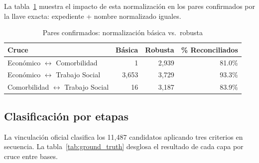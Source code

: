 La tabla~\ref{tab:normalizacion} muestra el impacto de esta normalización en los pares confirmados por la llave exacta: expediente + nombre normalizado iguales.

\begin{table}[H]
\centering
\small
\caption{Pares confirmados: normalización básica vs.\ robusta}
\label{tab:normalizacion}
\begin{tabular}{lrrr}
\toprule
\textbf{Cruce} & \textbf{Básica} & \textbf{Robusta} & \textbf{\% Reconciliados} \\
\midrule
Económico $\leftrightarrow$ Comorbilidad   &     1 & 2,939 & 81.0\% \\
Económico $\leftrightarrow$ Trabajo Social & 3,653 & 3,729 & 93.3\% \\
Comorbilidad $\leftrightarrow$ Trabajo Social & 16 & 3,187 & 83.9\% \\
\bottomrule
\end{tabular}
\end{table}

\subsection{Clasificación por etapas}

La vinculación oficial clasifica los 11,487 candidatos aplicando tres criterios en secuencia. La tabla~\ref{tab:ground_truth} desglosa el resultado de cada capa por cruce entre bases.

\begin{table}[H]
\centering
\small
\caption{Vinculación oficial: pares confirmados por capa y cruce}
\label{tab:ground_truth}
\end{table}


